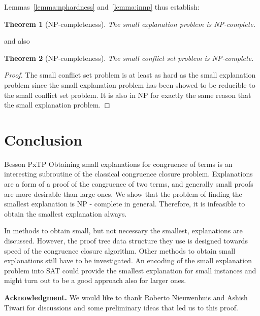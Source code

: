 \documentclass{easychair}
\newtheorem{theorem}{Theorem}
\begin{document}
Lemmas~\ref{lemma:nphardness} and~\ref{lemma:innp} thus establish:

\begin{theorem}[NP-completeness]
The small explanation problem is NP-complete.
\end{theorem}
\noindent and also
\begin{theorem}[NP-completeness]
The small conflict set problem is NP-complete.
\end{theorem}
\begin{proof}
The small conflict set problem is at least as hard as the small explanation problem since the small explanation problem has been showed to be reducible to the small conflict set problem.  It is also in NP for exactly the same reason that the small explanation problem.
\end{proof}


\section*{Conclusion}

Besson PxTP
Obtaining small explanations for congruence of terms is an interesting subroutine of the classical congruence closure problem.
Explanations are a form of a proof of the congruence of two terms, and generally small proofs are more desirable than large ones.
We show that the problem of finding the smallest explanation is NP - complete in general.
Therefore, it is infeasible to obtain the smallest explanation always.

In \cite{Nieuwenhuis3,Nieuwenhuis9} methods to obtain small, but not necessary the smallest, explanations are discussed.
However, the proof tree data structure they use is designed towards speed of the congruence closure algorithm.
Other methods to obtain small explanations still have to be investigated.
An encoding of the small explanation problem into SAT could provide the smallest explanation for small instances and might turn out to be a good approach also for larger ones.

\vspace*{5pt}\noindent
{\bf Acknowledgment.} We would like to thank Roberto Nieuwenhuis and Ashish
Tiwari for discussions and some preliminary ideas that led us to this proof.



\end{document}
